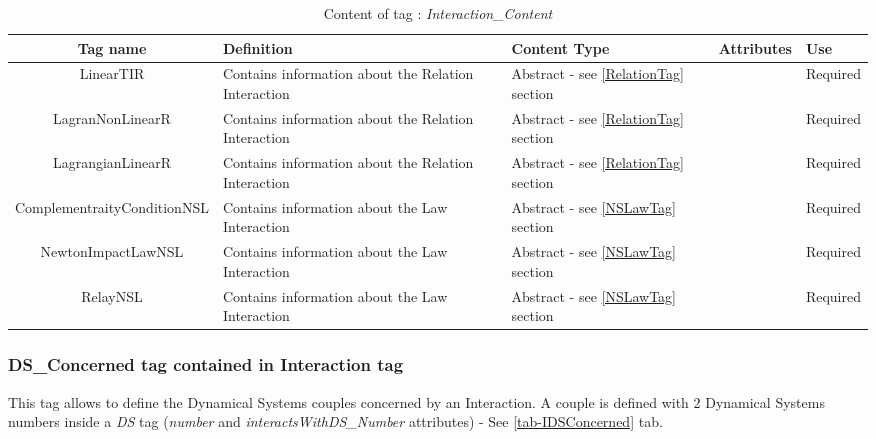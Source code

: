 \begin{table}[!hbp]
\begin{center}
\begin{tabular}{|c|p{4.8cm}|p{1.8cm}|p{1.8cm}|p{1.8cm}|}
\hline
\bf{Tag name} & \bf{Definition} & \bf{Content Type} & \bf{Attributes} & \bf{Use}
\\\hline
\hline
LinearTIR		& Contains information about the Relation Interaction & Abstract - see \ref{RelationTag} section & &  Required \\
LagranNonLinearR	& Contains information about the Relation Interaction & Abstract - see \ref{RelationTag} section & &  Required \\
LagrangianLinearR	& Contains information about the Relation Interaction & Abstract - see \ref{RelationTag} section & &  Required \\
\hline
ComplementraityConditionNSL	& Contains information about the Law Interaction & Abstract - see \ref{NSLawTag} section & &  Required \\
NewtonImpactLawNSL		& Contains information about the Law Interaction & Abstract - see \ref{NSLawTag} section & &  Required \\
RelayNSL			& Contains information about the Law Interaction & Abstract - see \ref{NSLawTag} section & &  Required \\
\hline
\end{tabular}
\end{center}
\caption{Content of tag : \textit{Interaction\_Content}}
\label{tab-InteractionContent}
\end{table}



\subsubsection{DS\_Concerned tag contained in Interaction tag}
\label{IDSConcernedTag}

This tag allows to define the Dynamical Systems couples concerned by an Interaction.
A couple is defined with 2 Dynamical Systems numbers inside a \textit{DS} tag (\textit{number} and \textit{interactsWithDS\_Number} attributes) - See \ref{tab-IDSConcerned} tab.\\


